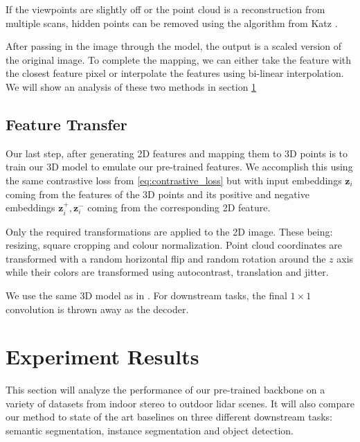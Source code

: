 \documentclass[10pt,twocolumn,letterpaper]{article}
\newcommand{\AJ}[1]{{\color{red}{[Andrej: #1]}}}
\begin{document}
If the viewpoints are slightly off or the point cloud is a reconstruction from multiple scans, hidden points can be removed using the algorithm from Katz \etal \cite{katz2007Direct}.

After passing in the image through the model, the output is a scaled version of the original image. To complete the mapping, we can either take the feature with the closest feature pixel or interpolate the features using bi-linear interpolation. We will show an analysis of these two methods in section \ref{sec:results}

\AJ{Do I need to give the equation for Bi-linear interpolation or is this also considered basic knowledge}

\subsection{Feature Transfer}
\label{sec:featureTransfer}

Our last step, after generating 2D features and mapping them to 3D points is to train our 3D model to emulate our pre-trained features. We accomplish this using the same contrastive loss from \ref{eq:contrastive_loss} but with input embeddings $\mathbf{z}_i$ coming from the features of the 3D points and its positive and negative embeddings $\mathbf{z}_i^{+},\mathbf{z}_i^{-}$ coming from the corresponding 2D feature.

Only the required transformations are applied to the 2D image. These being: resizing, square cropping and colour normalization. Point cloud coordinates are transformed with a random horizontal flip and random rotation around the $z$ axis while their colors are transformed using autocontrast, translation and jitter.

We use the same 3D model as in \cite{xie2020pointcontrast}. For downstream tasks, the final $1\times1$ convolution is thrown away as the decoder.

\AJ{Need to look at not using a projection head in 3D model.}

\clearpage
\section{Experiment Results}
\label{sec:results}

This section will analyze the performance of our pre-trained backbone on a variety of datasets from indoor stereo to outdoor lidar scenes. It will also compare our method to state of the art baselines on three different downstream tasks: semantic segmentation, instance segmentation and object detection.
\end{document}
